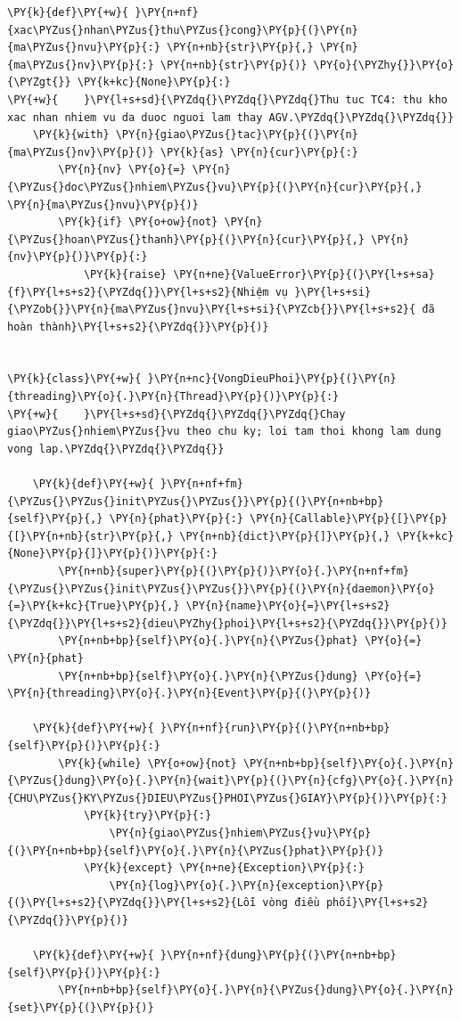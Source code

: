 \begin{Verbatim}[commandchars=\\\{\},frame=single,framerule=0.3pt,rulecolor=\color{black!40},fontsize=\footnotesize,breaklines=true]
\PY{k}{def}\PY{+w}{ }\PY{n+nf}{xac\PYZus{}nhan\PYZus{}thu\PYZus{}cong}\PY{p}{(}\PY{n}{ma\PYZus{}nvu}\PY{p}{:} \PY{n+nb}{str}\PY{p}{,} \PY{n}{ma\PYZus{}nv}\PY{p}{:} \PY{n+nb}{str}\PY{p}{)} \PY{o}{\PYZhy{}}\PY{o}{\PYZgt{}} \PY{k+kc}{None}\PY{p}{:}
\PY{+w}{    }\PY{l+s+sd}{\PYZdq{}\PYZdq{}\PYZdq{}Thu tuc TC4: thu kho xac nhan nhiem vu da duoc nguoi lam thay AGV.\PYZdq{}\PYZdq{}\PYZdq{}}
    \PY{k}{with} \PY{n}{giao\PYZus{}tac}\PY{p}{(}\PY{n}{ma\PYZus{}nv}\PY{p}{)} \PY{k}{as} \PY{n}{cur}\PY{p}{:}
        \PY{n}{nv} \PY{o}{=} \PY{n}{\PYZus{}doc\PYZus{}nhiem\PYZus{}vu}\PY{p}{(}\PY{n}{cur}\PY{p}{,} \PY{n}{ma\PYZus{}nvu}\PY{p}{)}
        \PY{k}{if} \PY{o+ow}{not} \PY{n}{\PYZus{}hoan\PYZus{}thanh}\PY{p}{(}\PY{n}{cur}\PY{p}{,} \PY{n}{nv}\PY{p}{)}\PY{p}{:}
            \PY{k}{raise} \PY{n+ne}{ValueError}\PY{p}{(}\PY{l+s+sa}{f}\PY{l+s+s2}{\PYZdq{}}\PY{l+s+s2}{Nhiệm vụ }\PY{l+s+si}{\PYZob{}}\PY{n}{ma\PYZus{}nvu}\PY{l+s+si}{\PYZcb{}}\PY{l+s+s2}{ đã hoàn thành}\PY{l+s+s2}{\PYZdq{}}\PY{p}{)}


\PY{k}{class}\PY{+w}{ }\PY{n+nc}{VongDieuPhoi}\PY{p}{(}\PY{n}{threading}\PY{o}{.}\PY{n}{Thread}\PY{p}{)}\PY{p}{:}
\PY{+w}{    }\PY{l+s+sd}{\PYZdq{}\PYZdq{}\PYZdq{}Chay giao\PYZus{}nhiem\PYZus{}vu theo chu ky; loi tam thoi khong lam dung vong lap.\PYZdq{}\PYZdq{}\PYZdq{}}

    \PY{k}{def}\PY{+w}{ }\PY{n+nf+fm}{\PYZus{}\PYZus{}init\PYZus{}\PYZus{}}\PY{p}{(}\PY{n+nb+bp}{self}\PY{p}{,} \PY{n}{phat}\PY{p}{:} \PY{n}{Callable}\PY{p}{[}\PY{p}{[}\PY{n+nb}{str}\PY{p}{,} \PY{n+nb}{dict}\PY{p}{]}\PY{p}{,} \PY{k+kc}{None}\PY{p}{]}\PY{p}{)}\PY{p}{:}
        \PY{n+nb}{super}\PY{p}{(}\PY{p}{)}\PY{o}{.}\PY{n+nf+fm}{\PYZus{}\PYZus{}init\PYZus{}\PYZus{}}\PY{p}{(}\PY{n}{daemon}\PY{o}{=}\PY{k+kc}{True}\PY{p}{,} \PY{n}{name}\PY{o}{=}\PY{l+s+s2}{\PYZdq{}}\PY{l+s+s2}{dieu\PYZhy{}phoi}\PY{l+s+s2}{\PYZdq{}}\PY{p}{)}
        \PY{n+nb+bp}{self}\PY{o}{.}\PY{n}{\PYZus{}phat} \PY{o}{=} \PY{n}{phat}
        \PY{n+nb+bp}{self}\PY{o}{.}\PY{n}{\PYZus{}dung} \PY{o}{=} \PY{n}{threading}\PY{o}{.}\PY{n}{Event}\PY{p}{(}\PY{p}{)}

    \PY{k}{def}\PY{+w}{ }\PY{n+nf}{run}\PY{p}{(}\PY{n+nb+bp}{self}\PY{p}{)}\PY{p}{:}
        \PY{k}{while} \PY{o+ow}{not} \PY{n+nb+bp}{self}\PY{o}{.}\PY{n}{\PYZus{}dung}\PY{o}{.}\PY{n}{wait}\PY{p}{(}\PY{n}{cfg}\PY{o}{.}\PY{n}{CHU\PYZus{}KY\PYZus{}DIEU\PYZus{}PHOI\PYZus{}GIAY}\PY{p}{)}\PY{p}{:}
            \PY{k}{try}\PY{p}{:}
                \PY{n}{giao\PYZus{}nhiem\PYZus{}vu}\PY{p}{(}\PY{n+nb+bp}{self}\PY{o}{.}\PY{n}{\PYZus{}phat}\PY{p}{)}
            \PY{k}{except} \PY{n+ne}{Exception}\PY{p}{:}
                \PY{n}{log}\PY{o}{.}\PY{n}{exception}\PY{p}{(}\PY{l+s+s2}{\PYZdq{}}\PY{l+s+s2}{Lỗi vòng điều phối}\PY{l+s+s2}{\PYZdq{}}\PY{p}{)}

    \PY{k}{def}\PY{+w}{ }\PY{n+nf}{dung}\PY{p}{(}\PY{n+nb+bp}{self}\PY{p}{)}\PY{p}{:}
        \PY{n+nb+bp}{self}\PY{o}{.}\PY{n}{\PYZus{}dung}\PY{o}{.}\PY{n}{set}\PY{p}{(}\PY{p}{)}
\end{Verbatim}
